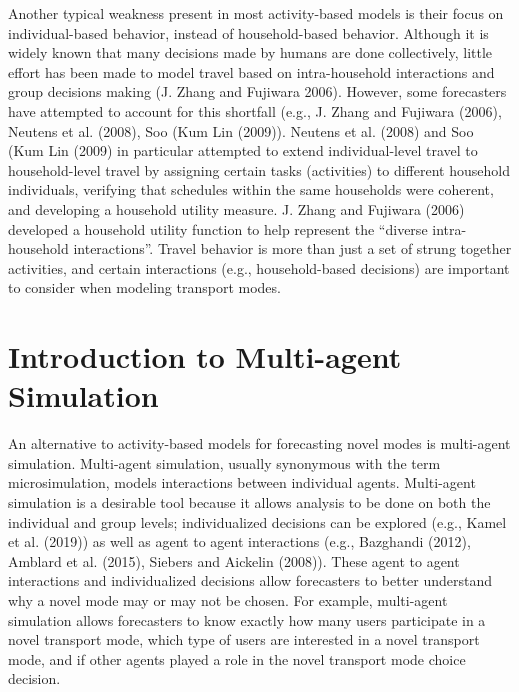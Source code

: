 \documentclass[12pt, oneside, openright]{byuthesis}
\begin{document}
Another typical weakness present in most activity-based models is their focus on individual-based behavior, instead of household-based behavior. Although it is widely known that many decisions made by humans are done collectively, little effort has been made to model travel based on intra-household interactions and group decisions making (J. Zhang and Fujiwara 2006). However, some forecasters have attempted to account for this shortfall (e.g., J. Zhang and Fujiwara (2006), Neutens et al. (2008), Soo (Kum Lin (2009)). Neutens et al. (2008) and Soo (Kum Lin (2009) in particular attempted to extend individual-level travel to household-level travel by assigning certain tasks (activities) to different household individuals, verifying that schedules within the same households were coherent, and developing a household utility measure. J. Zhang and Fujiwara (2006) developed a household utility function to help represent the ``diverse intra-household interactions''. Travel behavior is more than just a set of strung together activities, and certain interactions (e.g., household-based decisions) are important to consider when modeling transport modes.

\hypertarget{lit-mas}{%
\section{Introduction to Multi-agent Simulation}\label{lit-mas}}

An alternative to activity-based models for forecasting novel modes is multi-agent simulation. Multi-agent simulation, usually synonymous with the term microsimulation, models interactions between individual agents. Multi-agent simulation is a desirable tool because it allows analysis to be done on both the individual and group levels; individualized decisions can be explored (e.g., Kamel et al. (2019)) as well as agent to agent interactions (e.g., Bazghandi (2012), Amblard et al. (2015), Siebers and Aickelin (2008)). These agent to agent interactions and individualized decisions allow forecasters to better understand why a novel mode may or may not be chosen. For example, multi-agent simulation allows forecasters to know exactly how many users participate in a novel transport mode, which type of users are interested in a novel transport mode, and if other agents played a role in the novel transport mode choice decision.
\end{document}
